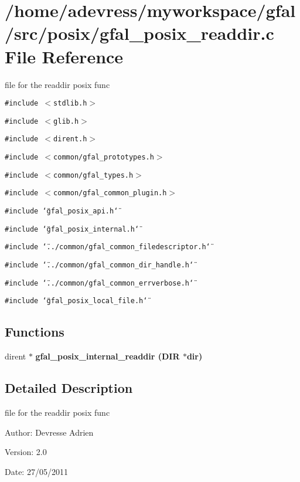 \section{/home/adevress/myworkspace/gfal/src/posix/gfal\_\-posix\_\-readdir.c File Reference}
\label{gfal__posix__readdir_8c}
file for the readdir posix func 

{\tt \#include $<$stdlib.h$>$}\par
{\tt \#include $<$glib.h$>$}\par
{\tt \#include $<$dirent.h$>$}\par
{\tt \#include $<$common/gfal\_\-prototypes.h$>$}\par
{\tt \#include $<$common/gfal\_\-types.h$>$}\par
{\tt \#include $<$common/gfal\_\-common\_\-plugin.h$>$}\par
{\tt \#include \char`\"{}gfal\_\-posix\_\-api.h\char`\"{}}\par
{\tt \#include \char`\"{}gfal\_\-posix\_\-internal.h\char`\"{}}\par
{\tt \#include \char`\"{}../common/gfal\_\-common\_\-filedescriptor.h\char`\"{}}\par
{\tt \#include \char`\"{}../common/gfal\_\-common\_\-dir\_\-handle.h\char`\"{}}\par
{\tt \#include \char`\"{}../common/gfal\_\-common\_\-errverbose.h\char`\"{}}\par
{\tt \#include \char`\"{}gfal\_\-posix\_\-local\_\-file.h\char`\"{}}\par
\subsection*{Functions}
\begin{CompactItemize}
\item 
dirent $\ast$ \bf{gfal\_\-posix\_\-internal\_\-readdir} (DIR $\ast$dir)
\end{CompactItemize}


\subsection{Detailed Description}
file for the readdir posix func 

\begin{Desc}
\item[Author:]Devresse Adrien \end{Desc}
\begin{Desc}
\item[Version:]2.0 \end{Desc}
\begin{Desc}
\item[Date:]27/05/2011 \end{Desc}


